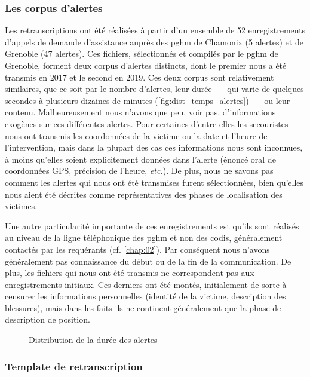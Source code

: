 \subsubsection{Les corpus d'alertes}

Les retranscriptions ont été réalisées à partir d'un ensemble de 52
enregistrements d'appels de demande d'assistance auprès des \ac{pghm}
de Chamonix (5 alertes) et de Grenoble (47 alertes). Ces fichiers,
sélectionnés et compilés par le \ac{pghm} de Grenoble, forment deux
corpus d'alertes distincts, dont le premier nous a été transmis en
2017 et le second en 2019. Ces deux corpus sont relativement
similaires, que ce soit par le nombre d'alertes, leur durée ---~qui
varie de quelques secondes à plusieurs dizaines de minutes
(\autoref{fig:dist_temps_alertes})~--- ou leur
contenu. Malheureusement nous n'avons que peu, voir pas,
d'informations exogènes sur ces différentes alertes. Pour certaines
d'entre elles les secouristes nous ont transmis les coordonnées de la
victime ou la date et l'heure de l'intervention, mais dans la plupart
des cas ces informations nous sont inconnues, à moins qu'elles soient
explicitement données dans l'alerte (\eg énoncé oral de coordonnées
GPS, précision de l'heure, \emph{etc.}). De plus, nous ne savons pas
comment les alertes qui nous ont été transmises furent sélectionnées,
bien qu'elles nous aient été décrites comme représentatives des phases
de localisation des victimes.

Une autre particularité importante de ces enregistrements est qu'ils
sont réalisés au niveau de la ligne téléphonique des \ac{pghm} et non
des \ac{codis}, généralement contactés par les requérants
(cf. \autoref{chap:02}). Par conséquent nous n'avons généralement pas
connaissance du début ou de la fin de la communication. De plus, les
fichiers qui nous ont été transmis ne correspondent pas aux
enregistrements initiaux. Ces derniers ont été montés, initialement de
sorte à censurer les informations personnelles (\eg identité de la
victime, description des blessures), mais dans les faits ils ne
continent généralement que la phase de description de position.

\begin{figure}
  \centering
  
  \caption{Distribution de la durée des alertes}
  \label{fig:dist_temps_alertes}
\end{figure}

\subsubsection{Template de retranscription}

